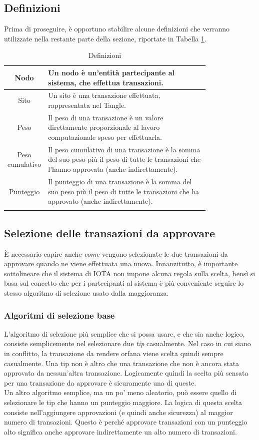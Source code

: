 \documentclass[12pt,a4paper,openright,twoside]{report}
\begin{document}
\subsection{Definizioni}
Prima di proseguire, è opportuno stabilire alcune definizioni che verranno utilizzate nella restante parte della sezione, riportate in Tabella \ref{tab:tangle_def}. 
\begin{center}
\begin{longtable}{c|m{0.8\linewidth}}
\hline \hline
Nodo & Un nodo è un'entità partecipante al sistema, che effettua transazioni.\\
\hline
Sito & Un sito è una transazione effettuata, rappresentata nel Tangle.\\
\hline
Peso & Il peso di una transazione è un valore direttamente proporzionale al lavoro computazionale speso per effettuarla.\\
\hline
Peso cumulativo & Il peso cumulativo di una transazione è la somma del suo peso più il peso di tutte le transazioni che l'hanno approvata (anche indirettamente).\\
\hline
Punteggio & Il punteggio di una transazione è la somma del suo peso più il peso di tutte le transazioni che ha approvato (anche indirettamente).\\
\hline \hline
\caption[Definizioni Tangle]{Definizioni}\label{tab:tangle_def}
\end{longtable}
\end{center}
\vspace{-20mm}
\subsection{Selezione delle transazioni da approvare} \label{selection_algorithm}
È necessario capire anche \textit{come} vengono selezionate le due transazioni da approvare quando ne viene effettuata una nuova. Innanzitutto, è importante sottolineare che il sistema di IOTA non impone alcuna regola sulla scelta, bensì si basa sul concetto che per i partecipanti al sistema è più conveniente seguire lo stesso algoritmo di selezione usato dalla maggioranza.
\subsubsection{Algoritmi di selezione base}
L'algoritmo di selezione più semplice che si possa usare, e che sia anche logico, consiste semplicemente nel selezionare due \textit{tip} casualmente. Nel caso in cui siano in conflitto, la transazione da rendere orfana viene scelta quindi sempre casualmente. Una tip non è altro che una transazione che non è ancora stata approvata da nessun'altra transazione. Logicamente quindi la scelta più sensata per una transazione da approvare è sicuramente una di queste.\\
Un altro algoritmo semplice, ma un po' meno aleatorio, può essere quello di selezionare le tip che hanno un punteggio maggiore. La logica di questa scelta consiste nell'aggiungere approvazioni (e quindi anche sicurezza) al maggior numero di transazioni. Questo è perché approvare transazioni con un punteggio alto significa anche approvare indirettamente un alto numero di transazioni.
\end{document}

